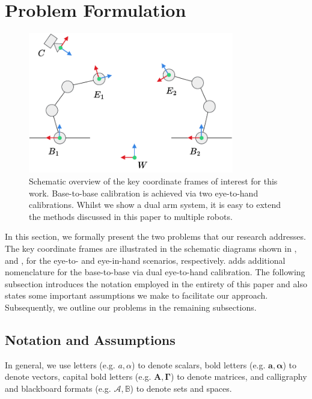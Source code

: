 \section{Problem Formulation}
\begin{figure}[tb]
    \centering
    \includegraphics[width=0.8\textwidth]{chapter_1/fig/eye_in_to_hand.pdf}
    \caption{
    Schematic overview of the key coordinate frames of interest for this work. Base-to-base calibration is achieved via two eye-to-hand calibrations. Whilst we show a dual arm system, it is easy to extend the methods discussed in this paper to multiple robots.
    }
    \label{c1:fig:base2base}
\end{figure}
In this section, we formally present the two problems that our research addresses. The key coordinate frames are illustrated in the schematic diagrams shown in , and , for the eye-to- and eye-in-hand scenarios, respectively.  adds additional nomenclature for the base-to-base via dual eye-to-hand calibration. The following subsection introduces the notation employed in the entirety of this paper and also states some important assumptions we make to facilitate our approach. 
Subsequently, we outline our problems in the remaining subsections.

\subsection{Notation and Assumptions}
In general, we use letters (e.g. $a, \alpha$) to denote scalars, bold letters (e.g. $\mathbf{a},\boldsymbol{\alpha}$) to denote vectors, 
capital bold letters (e.g. $\mathbf{A}, \mathbf{\Gamma}$) to denote matrices, and 
calligraphy and blackboard formats (e.g. $\mathcal{A}, \mathbb{B}$) to denote sets and spaces.

